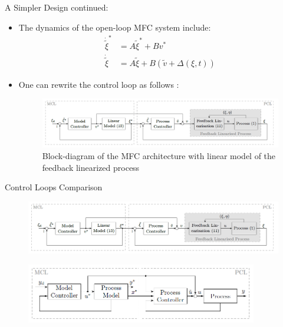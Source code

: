 \begin{frame}{A Simpler Design}
\cite{Tietze2023CruiseControl} continued:

\begin{itemize}
    \item The dynamics of the open-loop MFC system include:
 \begin{align}
    \dot{\tilde{\xi}}^* &= A\tilde{\xi}^* + Bv^* \\
    \dot{\tilde{\xi}} &= A\tilde{\xi} + B(\tilde{v} + \Delta(\xi, t))
 \end{align}
    
    \item One can rewrite the control loop as follows : 

    \begin{figure}
        \centering
        \includegraphics[width=0.9\linewidth]{imgs/MFC/MFCEfficient.PNG}
        \caption{Block-diagram of the MFC architecture with linear model of the feedback linearized process \cite{Tietze2023CruiseControl}}
        \label{fig:Blockdiagram of the MFC architecture with linear model of the feedback linearised process}
    \end{figure}

\end{itemize}
\end{frame}

\begin{frame}{Control Loops Comparison}
    \begin{figure}
        \centering
        \includegraphics[width=0.9\linewidth]{imgs/MFC/MFCEfficient.PNG}
        
        \label{fig:Blockdiagram of the MFC architecture with linear model of the feedback linearised process}
    \end{figure}

     \begin{figure}
       
        \label{fig:MFC Control Loop}
        \centering
        \includegraphics[width=0.9\textwidth]{imgs/MFC/MFC_scheme.PNG}
     \end{figure}

    
\end{frame}


